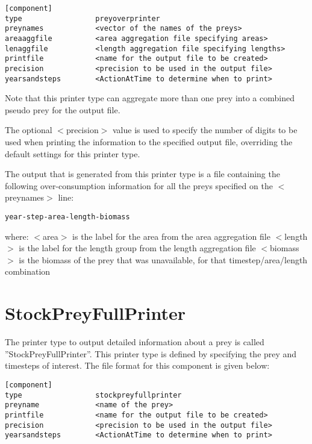 \documentclass[10pt,twoside]{book}
\begin{document}
{\small\begin{verbatim}
[component]
type                 preyoverprinter
preynames            <vector of the names of the preys>
areaaggfile          <area aggregation file specifying areas>
lenaggfile           <length aggregation file specifying lengths>
printfile            <name for the output file to be created>
precision            <precision to be used in the output file>
yearsandsteps        <ActionAtTime to determine when to print>
\end{verbatim}}

Note that this printer type can aggregate more than one prey into a combined pseudo prey for the output file.

\bigskip
The optional $<$precision$>$ value is used to specify the number of digits to be used when printing the information to the specified output file, overriding the default settings for this printer type.

\bigskip
The output that is generated from this printer type is a file containing the following over-consumption information for all the preys specified on the $<$preynames$>$ line:

{\small\begin{verbatim}
year-step-area-length-biomass
\end{verbatim}}

where:\newline
$<$area$>$ is the label for the area from the area aggregation file\newline
$<$length$>$ is the label for the length group from the length aggregation file\newline
$<$biomass$>$ is the biomass of the prey that was unavailable, for that timestep/area/length combination

\section{StockPreyFullPrinter}\label{sec:stockpreyfullprinter}
The printer type to output detailed information about a prey is called ''StockPreyFullPrinter''.  This printer type is defined by specifying the prey and timesteps of interest.  The file format for this component is given below:

{\small\begin{verbatim}
[component]
type                 stockpreyfullprinter
preyname             <name of the prey>
printfile            <name for the output file to be created>
precision            <precision to be used in the output file>
yearsandsteps        <ActionAtTime to determine when to print>
\end{verbatim}}
\end{document}
